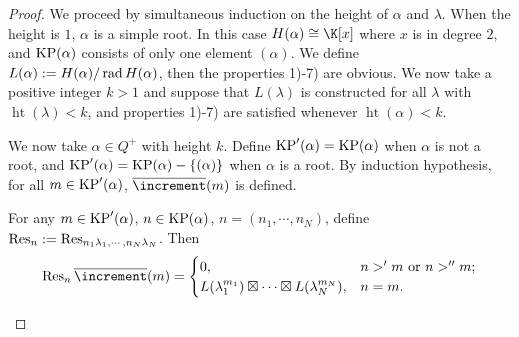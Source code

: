 \begin{proof}
    We proceed by simultaneous induction on the height of $\alpha$ and
    $\lambda$. When the height is $1$, $\alpha$ is a simple root.
    In this case $H(\alpha)\cong\K[x]$ where $x$ is in degree $2$,
    and $\operatorname{KP}(\alpha)$ consists of only one element $(\alpha)$. We define
    $L(\alpha) := H(\alpha)/\operatorname{rad} H(\alpha)$, then the properties 1)-7)
    are obvious. We now take a positive integer $k>1$ and suppose that
    $L(\lambda)$ is constructed for all $\lambda$ with $\operatorname{ht}(\lambda)<k$,
    and properties 1)-7) are satisfied whenever $\operatorname{ht}(\alpha)<k$.

    We now take $\alpha\in Q^+$ with height $k$. Define $\operatorname{KP}'(\alpha) = \operatorname{KP}(\alpha)$
    when $\alpha$ is not a root, and $\operatorname{KP}'(\alpha) = \operatorname{KP}(\alpha)-\{(\alpha)\}$
    when $\alpha$ is a root. By induction hypothesis, for all $m\in\operatorname{KP}'(\alpha)$,
    $\pstd(m)$ is defined. 

    \begin{lemma}\label{res-of-proper-std}
        For any $m\in\operatorname{KP}'(\alpha)$, $n\in\operatorname{KP}(\alpha)$, $n = (n_1,\cdots,n_N)$,
        define $\operatorname{Res}_n := \operatorname{Res}_{n_1\lambda_1,\cdots,n_N\lambda_N}$. Then 
        \[
            \Res_n\pstd(m) = 
            \begin{cases}
                0,&n>'m\text{ or }n>''m;\\
                L(\lambda_1^{m_1})\ex\cdots\ex L(\lambda_N^{m_N}),&n = m.
            \end{cases}
        \]     
    \end{lemma}


\end{proof}
